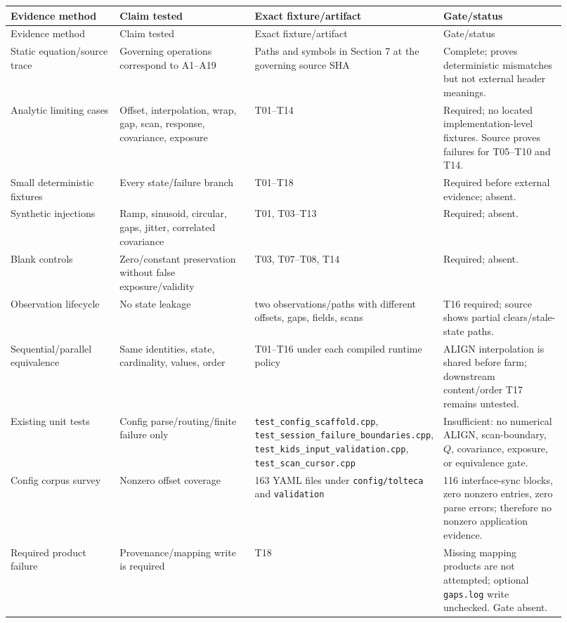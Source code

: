 \documentclass[11pt]{article}
\newcommand{\code}[1]{\nolinkurl{#1}}
\begin{document}
\begin{longtable}{L{0.20\linewidth}L{0.25\linewidth}L{0.24\linewidth}L{0.23\linewidth}}
\toprule
Evidence method & Claim tested & Exact fixture/artifact & Gate/status\\
\midrule
\endfirsthead
\toprule
Evidence method & Claim tested & Exact fixture/artifact & Gate/status\\
\midrule
\endhead
Static equation/source trace & Governing operations correspond to A1--A19 & Paths and symbols in Section 7 at the governing source SHA & Complete; proves deterministic mismatches but not external header meanings.\\
Analytic limiting cases & Offset, interpolation, wrap, gap, scan, response, covariance, exposure & T01--T14 & Required; no located implementation-level fixtures.  Source proves failures for T05--T10 and T14.\\
Small deterministic fixtures & Every state/failure branch & T01--T18 & Required before external evidence; absent.\\
Synthetic injections & Ramp, sinusoid, circular, gaps, jitter, correlated covariance & T01, T03--T13 & Required; absent.\\
Blank controls & Zero/constant preservation without false exposure/validity & T03, T07--T08, T14 & Required; absent.\\
Observation lifecycle & No state leakage & two observations/paths with different offsets, gaps, fields, scans & T16 required; source shows partial clears/stale-state paths.\\
Sequential/parallel equivalence & Same identities, state, cardinality, values, order & T01--T16 under each compiled runtime policy & ALIGN interpolation is shared before farm; downstream content/order T17 remains untested.\\
Existing unit tests & Config parse/routing/finite failure only & \code{test_config_scaffold.cpp}, \code{test_session_failure_boundaries.cpp}, \code{test_kids_input_validation.cpp}, \code{test_scan_cursor.cpp} & Insufficient: no numerical ALIGN, scan-boundary, $Q$, covariance, exposure, or equivalence gate.\\
Config corpus survey & Nonzero offset coverage & 163 YAML files under \code{config/tolteca} and \code{validation} & 116 interface-sync blocks, zero nonzero entries, zero parse errors; therefore no nonzero application evidence.\\
Required product failure & Provenance/mapping write is required & T18 & Missing mapping products are not attempted; optional \code{gaps.log} write unchecked.  Gate absent.\\

\end{longtable}
\end{document}
